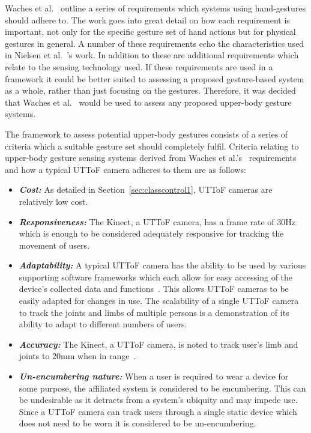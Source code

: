 \documentclass[manuscript, review, screen]{acmart}
\begin{document}
Waches et al.~\citeyearpar{Wachs2011} outline a series of requirements which systems using hand-gestures should adhere to.
The work goes into great detail on how each requirement is important, not only for the specific gesture set of hand actions but for physical gestures in general.
A number of these requirements echo the characteristics used in Nielsen et al.~\citeyearpar{Nielsen2004}'s work.
In addition to these are additional requirements which relate to the sensing technology used.
If these requirements are used in a framework it could be better suited to assessing a proposed gesture-based system as a whole, rather than just focusing on the gestures.
Therefore, it was decided that Waches et al.~\citeyearpar{Wachs2011} would be used to assess any proposed upper-body gesture systems.

The framework to assess potential upper-body gestures consists of a series of criteria which a suitable gesture set should completely fulfil.
Criteria relating to upper-body gesture sensing systems derived from Waches et al.'s~\citeyearpar{Wachs2011} requirements and how a typical \ac{UTToF} camera adheres to them are as follows:

\begin{itemize}
\item  \textit{\textbf{Cost:}} As detailed in Section~\ref{sec:classcontrol1}, \ac{UTToF} cameras are relatively low cost.
\item \textit{\textbf{Responsiveness:}} The Kinect, a \ac{UTToF} camera, has a frame rate of 30Hz~\cite{Livingston2012} which is enough to be considered adequately responsive for tracking the movement of users.
\item \textit{\textbf{Adaptability:}} A typical \ac{UTToF} camera has the ability to be used by various supporting software frameworks which each allow for easy accessing of the device's collected data and functions~\cite{Goth2011}.
This allows \ac{UTToF} cameras to be easily adapted for changes in use.
The scalability of a single \ac{UTToF} camera  to track the joints and limbs of multiple persons is a demonstration of its ability to adapt to different numbers of users.
\item \textit{\textbf{Accuracy:}} The Kinect, a \ac{UTToF} camera, is noted to track user's limb and joints to 20mm when in range~\cite{Marquardt2011}. 
\item \textit{\textbf{Un-encumbering nature:}} When a user is required to wear a device for some purpose, the affiliated system is considered to be encumbering.
This can be undesirable as it detracts from a system's ubiquity and may impede use. 
Since a \ac{UTToF} camera can track users through a single static device which does not need to be worn it is considered to be un-encumbering.\\ 
\end{itemize}
\end{document}
